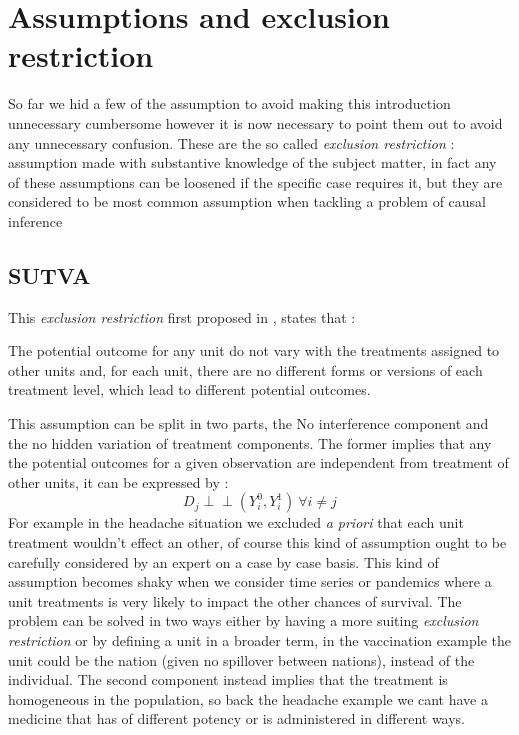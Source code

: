 \section{Assumptions and exclusion restriction}
So far we hid a few of the assumption to avoid making this introduction unnecessary cumbersome however it is now necessary to point them out to avoid any unnecessary confusion.
These are the so called \textit{exclusion  restriction} : assumption made with substantive knowledge of the subject matter, in fact any of these assumptions can be loosened if the specific case requires it, but they are considered to be most common assumption when tackling a problem of causal inference \citep{imbens2015causal}

\subsection{SUTVA}
This \textit{exclusion restriction} first proposed in  \citep{rubin1980randomization}, states that :
\begin{ass}
The potential outcome for any unit do not vary with the treatments assigned to other units and, for each unit, there are no different forms or versions of each treatment level, which lead to different potential outcomes.
\label{sutva}
\end{ass}
\citep{imbens2015causal}

This assumption can be split in two parts, the No interference component and the no hidden variation of treatment components. The former implies that any the potential outcomes for a given observation are independent from treatment of other units, it can be expressed by :
$$ D_j \perp\!\!\!\perp (Y^{0}_i,Y^{1}_i) \ \forall i \not = j $$
For example in the headache situation we excluded \textit{a priori} that each unit treatment wouldn't effect an other, of course this kind of assumption ought to be carefully considered  by an expert on a case by case basis.
This kind of assumption becomes shaky when we consider time series or pandemics where a unit treatments is very likely to impact the other chances of survival. The problem can be solved in two ways either by having a more suiting \textit{exclusion restriction} or by defining a unit in a broader term, in the vaccination example the unit could be the nation (given no spillover between nations), instead of the individual. 
The second component instead implies that the treatment is homogeneous in the population, so back the headache example we cant have a medicine that has of different potency or is administered in different ways.

